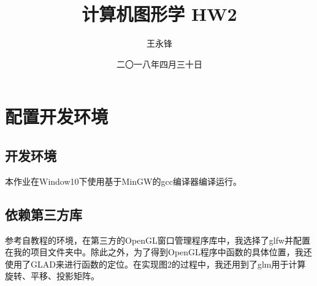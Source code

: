 \documentclass[forprint]{myreport}
\begin{document}
\title{计算机图形学 HW2}
\author{王永锋}                            %
\date{二〇一八年四月三十日}                %
\maketitle
\frontmatter
\tableofcontents
\mainmatter 

\chapter{配置开发环境}

\section{开发环境}

本作业在Window10下使用基于MinGW的gcc编译器编译运行。

\section{依赖第三方库}

参考自教程\cite{r1}的环境，在第三方的OpenGL窗口管理程序库中，我选择了glfw并配置在我的项目文件夹中。除此之外，为了得到OpenGL程序中函数的具体位置，我还使用了GLAD来进行函数的定位。在实现图2的过程中，我还用到了glm用于计算旋转、平移、投影矩阵。
\end{document}
